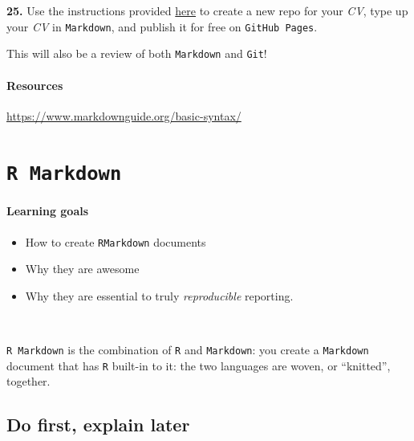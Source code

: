 \documentclass[
]{book}
\providecommand{\tightlist}{%
  \setlength{\itemsep}{0pt}\setlength{\parskip}{0pt}}
\begin{document}
\textbf{25.} Use the instructions provided \href{https://workwithcarolyn.com/blog/digital-cv-guide}{here} to create a new repo for your \emph{CV}, type up your \emph{CV} in \texttt{Markdown}, and publish it for free on \texttt{GitHub\ Pages}.

This will also be a review of both \texttt{Markdown} and \texttt{Git}!

\hypertarget{resources}{%
\subsubsection*{Resources}\label{resources}}

\url{https://www.markdownguide.org/basic-syntax/}

\hypertarget{r-markdown}{%
\chapter{\texorpdfstring{\texttt{R\ Markdown}}{R Markdown}}\label{r-markdown}}

\hypertarget{learning-goals-11}{%
\subsubsection*{Learning goals}\label{learning-goals-11}}

\begin{itemize}
\tightlist
\item
  How to create \texttt{RMarkdown} documents\\
\item
  Why they are awesome\\
\item
  Why they are essential to truly \emph{reproducible} reporting.
\end{itemize}

~

\texttt{R\ Markdown} is the combination of \texttt{R} and \texttt{Markdown}: you create a \texttt{Markdown} document that has \texttt{R} built-in to it: the two languages are woven, or ``knitted'', together.

\hypertarget{do-first-explain-later}{%
\section*{Do first, explain later}\label{do-first-explain-later}}
\end{document}
